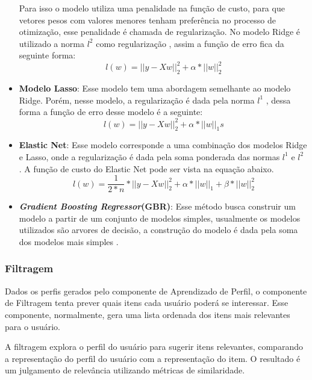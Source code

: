 \begin{itemize}
    Para isso o modelo utiliza uma penalidade na função de custo, para que vetores pesos com valores menores tenham preferência no processo de otimização\cite{Goodfellow-et-al-2016}, esse penalidade é chamada de regularização. No modelo Ridge é utilizado a norma \(l^2\) como regularização \cite{scikit-learn}, assim a função de erro fica da seguinte forma:
    \begin{equation}
        l(w) = ||y - Xw||^2_2 + \alpha * ||w||^2_2
    \end{equation}
    \item \textbf{Modelo Lasso}: Esse modelo tem uma abordagem semelhante ao modelo Ridge. Porém, nesse modelo, a regularização é dada pela norma \(l^1\) \cite{scikit-learn}, dessa forma a função de erro desse modelo é a seguinte:
    \begin{equation}
        l(w) = ||y - Xw||^2_2 + \alpha * ||w||_1s
    \end{equation}
    \item \textbf{Elastic Net}: Esse modelo corresponde a uma combinação dos modelos Ridge e Lasso, onde a regularização é dada pela soma ponderada das normas \(l^1\) e \(l^2\) \cite{scikit-learn}. A função de custo do Elastic Net pode ser vista na equação abaixo.
    \begin{equation}
        l(w) = \frac{1}{2*n} * ||y - Xw||^2_2 +  \alpha * ||w||_1 +  \beta * ||w||^2_2 
    \end{equation}
    \item \textbf{\textit{Gradient Boosting Regressor}(GBR)}: Esse método busca construir um modelo a partir de um conjunto de modelos simples, usualmente os modelos utilizados são arvores de decisão, a construção do modelo é dada pela soma dos modelos mais simples \cite{friedman2002stochastic}.
\end{itemize}

\subsubsection{Filtragem}
Dados os perfis gerados pelo componente de Aprendizado de Perfil, o componente de Filtragem tenta prever quais itens cada usuário poderá se interessar. Esse componente, normalmente, gera uma lista ordenada dos itens mais relevantes para o usuário\cite{lops2011content}. 

A filtragem explora o perfil do usuário para sugerir itens relevantes, comparando a representação do perfil do usuário com a representação do item. O resultado é um julgamento de relevância utilizando métricas de similaridade.


